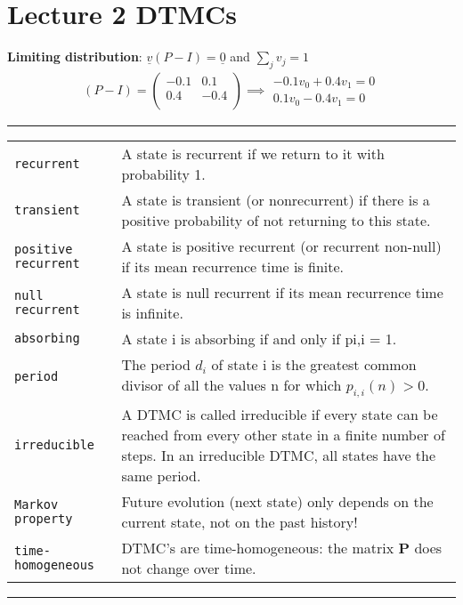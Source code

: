 \section{Lecture 2 DTMCs}

\textbf{Limiting distribution}: $\underline{v}(P - I) = \underline{0}$ and $\sum_{j} v_{j} = 1$\\
\begin{align*}
(P-I) = \begin{pmatrix}
  -0.1 & 0.1  \\
  0.4 & -0.4 \\
 \end{pmatrix} \implies 
	\begin{split} 	
 	-0.1v_{0} + 0.4v_{1} = 0\\ 
	0.1v_{0} - 0.4v_{1} = 0
	\end{split}
\end{align*}
\newline
\hrule
{}
\begin{tabular}{@{}p{\the\MyLen}@{}p{\linewidth-\the\MyLen}@{}}
\verb!recurrent!				&	A state is recurrent if we return to it with probability 1.\\
\verb!transient!				&	A state is transient (or nonrecurrent) if there is a positive probability of not returning to this state.\\
\verb!positive recurrent!		&	A state is positive recurrent (or recurrent non-null) if its mean recurrence time is finite. \\
\verb!null recurrent!			&	A state is null recurrent if its mean recurrence time is infinite. \\
\verb!absorbing!				&	A state i is absorbing if and only if pi,i = 1. \\
\verb!period!					& The period $d_{i}$ of state i is the greatest common divisor of all the values n for which $p_{i,i}(n) > 0$.\\
\verb!irreducible!				& A DTMC is called irreducible if every state can be reached from every other state in a finite number of steps. In an irreducible DTMC, all states have the same period.\\
\verb!Markov property!			& Future evolution (next state) only depends on the current state, not on the past history!\\
\verb!time-homogeneous!			& DTMC’s are time-homogeneous: the matrix \textbf{P} does not change over time.\\
\end{tabular}
\newline
\hrule
